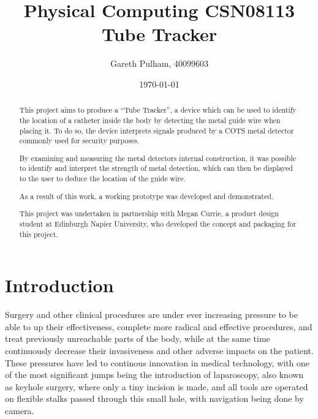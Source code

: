 \documentclass[a4paper]{article}
\begin{document}
    \begin{titlepage}
        \title{Physical Computing CSN08113\\
            Tube Tracker
        }
        \author{Gareth Pulham, 40099603}
        \date{\today}
        \maketitle
        \thispagestyle{empty}

        \begin{abstract}
            This project aims to produce a ``Tube Tracker'', a device which can be used to identify the location of a catheter inside the body by detecting the metal guide wire when placing it.
            To do so, the device interprets signals produced by a COTS metal detector commonly used for security purposes.

            By examining and measuring the metal detectors internal construction, it was possible to identify and interpret the strength of metal detection, which can then be displayed to the user to deduce the location of the guide wire.

            As a result of this work, a working prototype was developed and demonstrated.

            This project was undertaken in partnership with Megan Currie, a product design student at Edinburgh Napier University, who developed the concept and packaging for this project.
        \end{abstract}
    \end{titlepage}

    \tableofcontents

    \section{Introduction}
    Surgery and other clinical procedures are under ever increasing pressure to be able to up their effectiveness, complete more radical and effective procedures, and treat previously unreachable parts of the body, while at the same time continuously decrease their invasiveness and other adverse impacts on the patient. These pressures have led to continous innovation in medical technology, with one of the most significant jumps being the introduction of laparoscopy, also known as keyhole surgery, where only a tiny incision is made, and all tools are operated on flexible stalks passed through this small hole, with navigation being done by camera.
\end{document}
